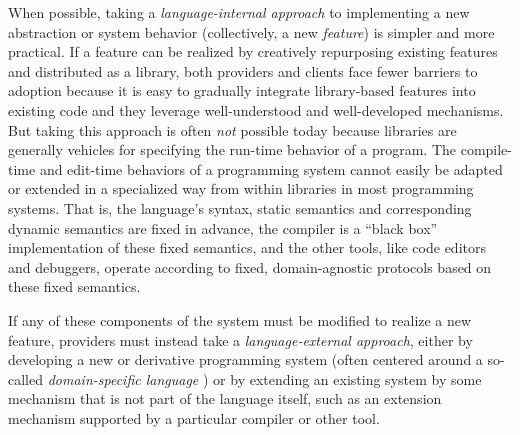 
When possible, taking a \emph{language-internal approach} to implementing a new abstraction or system behavior (collectively, a new \emph{feature}) is simpler and more practical. If a feature can be realized by creatively repurposing existing features and distributed as a library, both providers and clients face fewer barriers to adoption because it is easy to gradually integrate library-based features into existing code and they leverage well-understood and well-developed mechanisms. But taking this approach is often \emph{not} possible today because libraries are generally vehicles for specifying the run-time behavior of a program. The compile-time and edit-time behaviors of a programming system cannot easily be adapted or extended in a specialized way from within libraries in most programming systems. That is, the language's syntax, static semantics and corresponding dynamic semantics are fixed in advance, the compiler is a ``black box'' implementation of these fixed semantics, and the other tools, like code editors and debuggers, operate according to fixed, domain-agnostic protocols based on these fixed semantics.

If any of these components of the system must be modified to realize a new feature, providers must instead take a \emph{language-external approach}, either by developing a new or derivative programming system (often centered around a so-called \emph{domain-specific language} \cite{dsl}) or by extending an existing system by some mechanism that is not part of the language itself, such as an extension mechanism supported by a {particular} compiler or other tool. %

